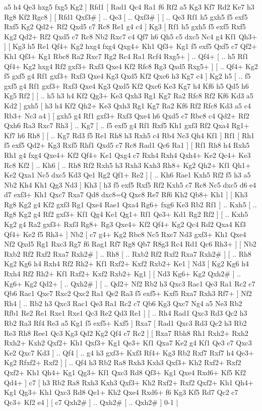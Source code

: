a5  h4 Qe3  hxg5 fxg5  Kg2   ]  Rfd1 [  Rad1 Qc4  Ra1 f6  Rf2 a5  Kg3 Kf7  Rd2 Ke7  h3 Rg8  Kf2 Rgc8   ]  [  Rfd1 Qxf3#   ] .. Qe3 [ .. Qxf3#   ]  [ .. Qe3  Rf1 h5  gxh5 f5  exf5 Rxf5  Kg2 Qd2+  Rf2 Qxd5  c7 Rc8  Re1 g4  c4   ]  Kg3 [  Rf1 h5  gxh5 f5  exf5 Rxf5  Kg2 Qd2+  Rf2 Qxd5  c7 Rc8  Nb2 Rxc7  c4 Qf7  h6 Qh5  c5 dxc5  Nc4 g4  Kf1 Qh3+   ]  [  Kg3 h5  Re1 Qf4+  Kg2 hxg4  fxg4 Qxg4+  Kh1 Qf3+  Kg1 f5  exf5 Qxf5  c7 Qf2+  Kh1 Qf3+  Kg1 Rbc8  Ra2 Rxc7  Rg2 Rc4  Ra1 Rcf4  Rxg5+   ] .. Qf4+ [ .. h5  Rf1 Qf4+  Kg2 hxg4  Rf2 gxf3+  Rxf3 Qxe4  Kf2 Rfc8  Rg3 Qxd5  Rxg5+   ]  [ .. Qf4+  Kg2 f5  gxf5 g4  Rf1 gxf3+  Rxf3 Qxe4  Kg3 Qxd5  Kf2 Qxc6  h3 Kg7  c4   ]  Kg2   h5 [ .. f5  gxf5 g4  Rf1 gxf3+  Rxf3 Qxe4  Kg3 Qxd5  Kf2 Qxc6  Ke3 Kg7  h4 Kf6  h5 Qd5  h6 Kg5  Rf2   ]  [ .. h5  h3 h4  Kf2 Qg3+  Ke3 Qxh3  Rg1 Kg7  Ra2 Rfc8  Rf2 Kf6  Kd3 a5  Kd2   ]  gxh5 [  h3 h4  Kf2 Qh2+  Ke3 Qxh3  Rg1 Kg7  Ra2 Kf6  Rf2 Rfc8  Kd3 a5  c4 Rb3+  Nc3 a4   ]  [  gxh5 g4  Rf1 gxf3+  Rxf3 Qxe4  h6 Qxd5  c7 Rbc8  c4 Qd2+  Rf2 Qxh6  Ra3 Rxc7  Rh3   ] .. Kg7 [ .. f5  exf5 g4  Rf1 Rxf5  Kh1 gxf3  Rf2 Qxa4  Rg1+ Kf7  h6 Rh8   ]  [ .. Kg7  Rd3 f5  Re1 Rh8  h3 Rxh5  c4 Rb4  Nc3 Qh4  Kf1   ]  Rf1 [  Rh1 f5  exf5 Qd2+  Kg3 Rxf5  Rhf1 Qxd5  c7 Rc8  Rad1 Qc6  Ra1   ]  [  Rf1 Rh8  h4 Rxh5  Rh1 g4  fxg4 Qxe4+  Kf2 Qf4+  Ke1 Qxg4  c7 Rxh4  Rxh4 Qxh4+  Ke2 Qc4+  Ke3 Rc8  Kf2   ] .. Kh6 [ .. Rh8  Rf2 Rxh5  h3 Rxh3  Kxh3 Rh8+  Kg2 Qh2+  Kf1 Qh1+  Ke2 Qxa1  Nc5 dxc5  Kd3 Qe1  Rg2 Qf1+  Re2   ]  [ .. Kh6  Rae1 Kxh5  Rf2 f5  h3 a5  Nb2 Kh4  Kh1 Qg3  Nd3   ]  Kh3 [  h3 f5  exf5 Rxf5  Rf2 Kxh5  c7 Rc8  Nc5 dxc5  d6 e4  d7 exf3+  Kh1 Qxc7  Rxa7 Qd8  dxc8=Q Qxc8  Re7 Rf6  Kh2 Qb8+  Kh1   ]  [  Kh3 Rg8  Kg2 g4  Kf2 gxf3  Rg1 Qxe4  Rae1 Qxa4  Rg6+ fxg6  Ke3 Rb2  Rf1   ] .. Kxh5 [ .. Rg8  Kg2 g4  Rf2 gxf3+  Kf1 Qg4  Ke1 Qg1+  Rf1 Qe3+  Kd1 Rg2  Rf2   ]  [ .. Kxh5  Kg2 g4  Ra2 gxf3+  Rxf3 Rg8+  Rg3 Qxe4+  Kf2 Qf4+  Kg2 Qc4  Rd2 Qxa4  Kf3 Qf4+  Ke2 f5  Rh3+   ]  Nb2 [  c7 g4+  Kg2 Rbc8  Nc5 Rxc7  Nd3 gxf3+  Kh1 Qxe4  Nf2 Qxd5  Rg1 Rxc3  Rg7 f6  Rag1 Rf7  Rg8 Qb7  R8g3 Rc4  Rd1 Qc6  Rh3+   ]  [  Nb2 Rxb2  Rf2 Rxf2  Rxa7 Rxh2#   ] .. Rh8 [ .. Rxb2  Rf2 Rxf2  Rxa7 Rxh2#   ]  [ .. Rh8  Kg2 Kg6  h4 Rxh4  Rf2 Rh2+  Kf1 Rxf2+  Kxf2 Rxb2+  Ke1   ]  Nd3 [  Kg2 Kg6  h4 Rxh4  Rf2 Rh2+  Kf1 Rxf2+  Kxf2 Rxb2+  Kg1   ]  [  Nd3 Kg6+  Kg2 Qxh2#   ] .. Kg6+    Kg2  Qd2+ [ .. Qxh2#   ]  [ .. Qd2+  Nf2 Rb2  h3 Qxc3  Rac1 Qe3  Ra1 Rc2  c7 Qb6  Rac1 Qxc7  Rxc2 Qxc2  Ra1 Qe2  Ra3 f5  exf5+ Kxf5  Rxa7 Rxh3  Rf7+   ]  Nf2   Rh4 [ .. Rb2  h3 Qxc3  Rac1 Qe3  Ra1 Rc2  c7 Qb6  Kg3 Qxc7  Ng4 a5  Ne3 Rb2  Rfb1 Re2  Re1 Rxe1  Rxe1 Qc3  Re2 Qd3  Re1   ]  [ .. Rh4  Rad1 Qxc3  Rd3 Qc2  h3 Rb2  Ra3 Rf4  Re3 a5  Kg1 f5  exf5+ Kxf5   ]  Rxa7 [  Rad1 Qxc3  Rd3 Qc2  h3 Rb2  Re3 Rh8  Ree1 Qc3  Kg3 Qd2  Kg2 Qf4  c7 Rc2   ]  [  Rxa7 Rbh8  Rh1 Rxh2+  Rxh2 Rxh2+  Kxh2 Qxf2+  Kh1 Qxf3+  Kg1 Qe3+  Kf1 Qxa7  Ke2 g4  Kf1 Qe3  c7 Qxc3  Ke2 Qxc7  Kd3   ] .. Qf4 [ .. g4  h3 gxf3+  Kxf3 Rf4+  Kg3 Rb2  Rxf7 Rxf7  h4 Qe3+  Kg2 Rfxf2+  Rxf2   ]  [ .. Qf4  h3 Rb2  Ra8 Rxh3  Kxh3 Qxf3+  Kh2 Rxf2+  Rxf2 Qxf2+  Kh1 Qh4+  Kg1 Qg3+  Kf1 Qxc3  Rd8 Qf3+  Kg1 Qxe4  Rxd6+ Kf5  Kf2 Qd4+   ]  c7 [  h3 Rb2  Ra8 Rxh3  Kxh3 Qxf3+  Kh2 Rxf2+  Rxf2 Qxf2+  Kh1 Qh4+  Kg1 Qg3+  Kh1 Qxc3  Rd8 Qe1+  Kh2 Qxe4  Rxd6+ f6  Kg3 Kf5  Rd7 Qc2  c7 Qc3+  Kf2 e4   ]  [  c7 Qxh2#   ] .. Qxh2#    [ .. Qxh2#   ] 0-1  |
